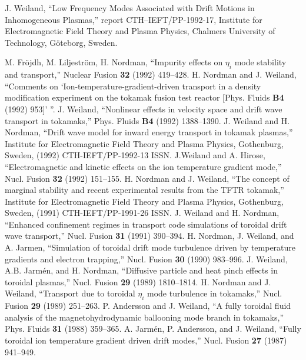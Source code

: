 \begin{thebibliography}{99}

 J. Weiland,
``Low Frequency Modes Associated with Drift Motions in
Inhomogeneous Plasmas,''
report CTH--IEFT/PP-1992-17,
Institute for Electromagnetic Field Theory and Plasma Physics,
Chalmers University of Technology,
G\"{o}teborg, Sweden.

 M. Fr\"{o}jdh, M. Liljestr\"{o}m, H. Nordman,
``Impurity effects on $\eta_i$ mode stability and transport,''
Nuclear Fusion {\bf 32} (1992) 419--428.
 H. Nordman and J. Weiland, ``Comments on
`Ion-temperature-gradient-driven 
transport in a density modification experiment on the tokamak fusion test
reactor [Phys. Fluids {\bf B4} (1992) 953]' ''.
 J. Weiland, 
``Nonlinear effects in velocity space and drift wave
transport in tokamaks,'' Phys. Fluids {\bf B4} (1992) 1388--1390.
 J. Weiland and H. Nordman, ``Drift wave model for inward
energy transport in tokamak plasmas,'' Institute for Electromagnetic Field
Theory and Plasma Physics, Gothenburg, Sweden, (1992) CTH-IEFT/PP-1992-13 ISSN.
 J.Weiland and A. Hirose, ``Electromagnetic and kinetic
effects on the ion temperature gradient mode,'' Nucl. Fusion {\bf 32} (1992)
151--155.
 H. Nordman and J. Weiland, ``The concept of marginal
stability and recent experimental results from the TFTR tokamak,'' Institute
for Electromagnetic Field Theory and Plasma Physics, Gothenburg, Sweden, (1991)
CTH-IEFT/PP-1991-26 ISSN.
 J. Weiland and H. Nordman, ``Enhanced confinement regimes in
transport code simulations of toroidal drift wave transport,'' Nucl. Fusion
{\bf 31} (1991) 390--394.
 H. Nordman, J. Weiland, and A. Jarmen, ``Simulation of
toroidal drift mode turbulence driven by temperature gradients and electron
trapping,'' Nucl. Fusion {\bf 30} (1990) 983--996.
 J. Weiland, A.B. Jarm\'{e}n, and H. Nordman, ``Diffusive
particle and heat pinch effects in toroidal plasmas,'' Nucl. Fusion {\bf 29}
(1989) 1810--1814.
 H. Nordman and J. Weiland, ``Transport due to toroidal
$\eta_i$ mode turbulence in tokamaks,'' Nucl. Fusion {\bf 29} (1989) 251--263.
 P. Andersson and J. Weiland, ``A fully toroidal fluid analysis
of the magnetohydrodynamic ballooning mode branch in tokamaks,'' Phys. Fluids
{\bf 31} (1988) 359--365.
 A. Jarm\'{e}n, P. Andersson, and J. Weiland, ``Fully toroidal
ion temperature gradient driven drift modes,'' Nucl. Fusion {\bf 27} (1987)
941--949.
\end{thebibliography}


